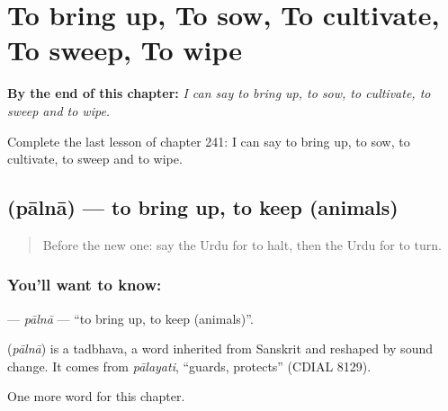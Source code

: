
\chapter{To bring up, To sow, To cultivate, To sweep, To wipe}
\label{ch:ur-to-bring-up-to-sow-to-cultivate-to-sweep-to-wipe}

\begin{chapteropening}
\textbf{By the end of this chapter:} \emph{I can say to bring up, to sow, to cultivate, to sweep and to wipe.}

Complete the last lesson of chapter 241: I can say to bring up, to sow, to cultivate, to sweep and to wipe.
\end{chapteropening}

\section[\texorpdfstring{\ur{پالنا} (pālnā)}{پالنا (pālnā)}]{ (pālnā) — to bring up, to keep (animals)}

\label{lesson:UR-C241-palna}



\begin{quote}
Before the new one: say the Urdu for to halt, then the Urdu for to turn.
\end{quote}

\subsection*{You'll want to know: }
\textbf{} — \emph{pālnā} — \textquotedblleft{}to bring up, to keep (animals)\textquotedblright{}.

\begin{cousinweb}
\textbf{} (\emph{pālnā}) is a tadbhava, a word inherited from Sanskrit and reshaped by sound change. It comes from \emph{pālayati}, \textquotedblleft{}guards, protects\textquotedblright{} (CDIAL 8129).
\end{cousinweb}

\begin{grammarlens}[title={What you've built}]
One more word for this chapter.
\end{grammarlens}

